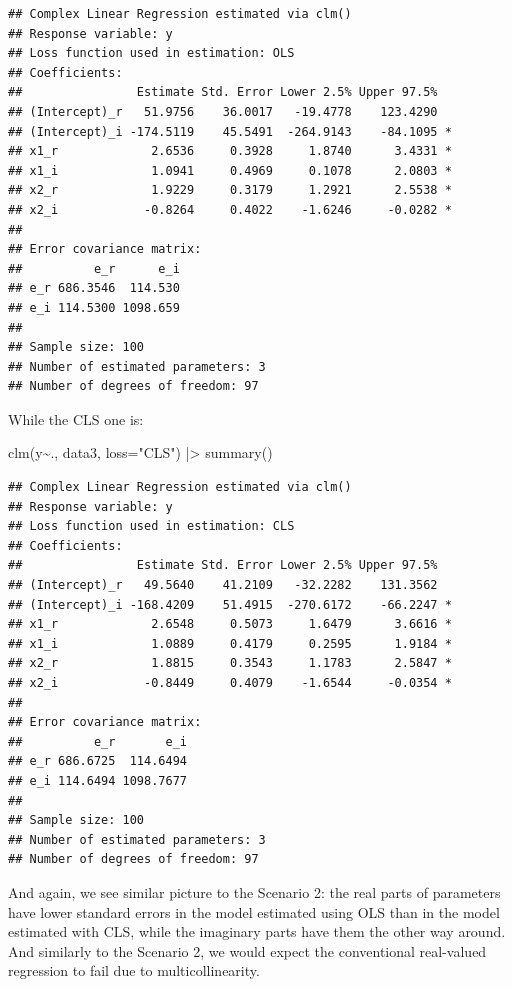 \documentclass[
]{book}
\newenvironment{Shaded}{\begin{snugshade}}{\end{snugshade}}
\newcommand{\AttributeTok}[1]{\textcolor[rgb]{0.77,0.63,0.00}{#1}}
\newcommand{\FunctionTok}[1]{\textcolor[rgb]{0.00,0.00,0.00}{#1}}
\newcommand{\NormalTok}[1]{#1}
\newcommand{\SpecialCharTok}[1]{\textcolor[rgb]{0.00,0.00,0.00}{#1}}
\newcommand{\StringTok}[1]{\textcolor[rgb]{0.31,0.60,0.02}{#1}}
\begin{document}
\begin{verbatim}
## Complex Linear Regression estimated via clm()
## Response variable: y
## Loss function used in estimation: OLS
## Coefficients:
##                Estimate Std. Error Lower 2.5% Upper 97.5%  
## (Intercept)_r   51.9756    36.0017   -19.4778    123.4290  
## (Intercept)_i -174.5119    45.5491  -264.9143    -84.1095 *
## x1_r             2.6536     0.3928     1.8740      3.4331 *
## x1_i             1.0941     0.4969     0.1078      2.0803 *
## x2_r             1.9229     0.3179     1.2921      2.5538 *
## x2_i            -0.8264     0.4022    -1.6246     -0.0282 *
## 
## Error covariance matrix:
##          e_r      e_i
## e_r 686.3546  114.530
## e_i 114.5300 1098.659
## 
## Sample size: 100
## Number of estimated parameters: 3
## Number of degrees of freedom: 97
\end{verbatim}

While the CLS one is:

\begin{Shaded}
\begin{Highlighting}[]
\FunctionTok{clm}\NormalTok{(y}\SpecialCharTok{\textasciitilde{}}\NormalTok{., data3, }\AttributeTok{loss=}\StringTok{"CLS"}\NormalTok{) }\SpecialCharTok{|\textgreater{}}
    \FunctionTok{summary}\NormalTok{()}
\end{Highlighting}
\end{Shaded}

\begin{verbatim}
## Complex Linear Regression estimated via clm()
## Response variable: y
## Loss function used in estimation: CLS
## Coefficients:
##                Estimate Std. Error Lower 2.5% Upper 97.5%  
## (Intercept)_r   49.5640    41.2109   -32.2282    131.3562  
## (Intercept)_i -168.4209    51.4915  -270.6172    -66.2247 *
## x1_r             2.6548     0.5073     1.6479      3.6616 *
## x1_i             1.0889     0.4179     0.2595      1.9184 *
## x2_r             1.8815     0.3543     1.1783      2.5847 *
## x2_i            -0.8449     0.4079    -1.6544     -0.0354 *
## 
## Error covariance matrix:
##          e_r       e_i
## e_r 686.6725  114.6494
## e_i 114.6494 1098.7677
## 
## Sample size: 100
## Number of estimated parameters: 3
## Number of degrees of freedom: 97
\end{verbatim}

And again, we see similar picture to the Scenario 2: the real parts of parameters have lower standard errors in the model estimated using OLS than in the model estimated with CLS, while the imaginary parts have them the other way around. And similarly to the Scenario 2, we would expect the conventional real-valued regression to fail due to multicollinearity.
\end{document}

